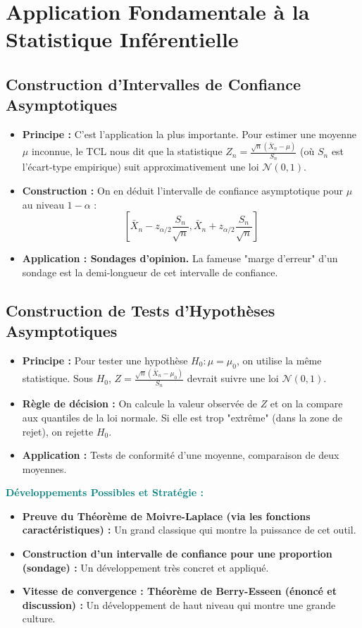 \documentclass[12pt, a4paper, parskip=full]{report}
\theoremstyle{agregstyle}
\newenvironment{developpements}
  {\par\medskip\noindent\begin{oframed}\noindent\textbf{\textcolor{teal}{Développements Possibles et Stratégie :}}}
  {\end{oframed}\par\medskip}
\begin{document}
\section{Application Fondamentale à la Statistique Inférentielle}
\subsection{Construction d'Intervalles de Confiance Asymptotiques}
\begin{itemize}
    \item \textbf{Principe :} C'est l'application la plus importante. Pour estimer une moyenne $\mu$ inconnue, le TCL nous dit que la statistique $Z_n = \frac{\sqrt{n}(\bar{X}_n - \mu)}{S_n}$ (où $S_n$ est l'écart-type empirique) suit approximativement une loi $\mathcal{N}(0,1)$.
    \item \textbf{Construction :} On en déduit l'intervalle de confiance asymptotique pour $\mu$ au niveau $1-\alpha$ :
    $$ \left[ \bar{X}_n - z_{\alpha/2} \frac{S_n}{\sqrt{n}}, \bar{X}_n + z_{\alpha/2} \frac{S_n}{\sqrt{n}} \right] $$
    \item \textbf{Application : Sondages d'opinion.} La fameuse "marge d'erreur" d'un sondage est la demi-longueur de cet intervalle de confiance.
\end{itemize}
\subsection{Construction de Tests d'Hypothèses Asymptotiques}
\begin{itemize}
    \item \textbf{Principe :} Pour tester une hypothèse $H_0: \mu = \mu_0$, on utilise la même statistique. Sous $H_0$, $Z = \frac{\sqrt{n}(\bar{X}_n - \mu_0)}{S_n}$ devrait suivre une loi $\mathcal{N}(0,1)$.
    \item \textbf{Règle de décision :} On calcule la valeur observée de $Z$ et on la compare aux quantiles de la loi normale. Si elle est trop "extrême" (dans la zone de rejet), on rejette $H_0$.
    \item \textbf{Application :} Tests de conformité d'une moyenne, comparaison de deux moyennes.
\end{itemize}

\begin{developpements}
    \begin{itemize}
        \item \textbf{Preuve du Théorème de Moivre-Laplace (via les fonctions caractéristiques) :} Un grand classique qui montre la puissance de cet outil.
        \item \textbf{Construction d'un intervalle de confiance pour une proportion (sondage) :} Un développement très concret et appliqué.
        \item \textbf{Vitesse de convergence : Théorème de Berry-Esseen (énoncé et discussion) :} Un développement de haut niveau qui montre une grande culture.
    \end{itemize}
\end{developpements}
\end{document}
